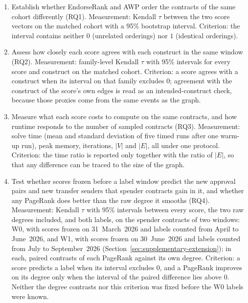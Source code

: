 \begin{enumerate}
\item[O1.] Establish whether EndorseRank and AWP order the contracts of the same cohort differently (RQ1). Measurement: Kendall $\tau$ between the two score vectors on the matched cohort with a 95\% bootstrap interval. Criterion: the interval contains neither $0$ (unrelated orderings) nor $1$ (identical orderings).
\item[O2.] Assess how closely each score agrees with each construct in the same window (RQ2). Measurement: family-level Kendall $\tau$ with 95\% intervals for every score and construct on the matched cohort. Criterion: a score agrees with a construct when its interval on that family excludes $0$; agreement with the construct of the score's own edges is read as an intended-construct check, because those proxies come from the same events as the graph.
\item[O3.] Measure what each score costs to compute on the same contracts, and how runtime responds to the number of sampled contracts (RQ3). Measurement: solve time (mean and standard deviation of five timed runs after one warm-up run), peak memory, iterations, $|V|$ and $|E|$, all under one protocol. Criterion: the time ratio is reported only together with the ratio of $|E|$, so that any difference can be traced to the size of the graph.
\item[O4.] Test whether scores frozen before a label window predict the new approval pairs and new transfer senders that spender contracts gain in it, and whether any PageRank does better than the raw degree it smooths (RQ4). Measurement: Kendall $\tau$ with 95\% intervals between every score, the two raw degrees included, and both labels, on the spender contracts of two windows: W0, with scores frozen on 31~March~2026 and labels counted from April to June~2026, and W1, with scores frozen on 30~June~2026 and labels counted from July to September~2026 (Section~\ref{sec:supplementary-extension}); in each, paired contrasts of each PageRank against its own degree. Criterion: a score predicts a label when its interval excludes $0$, and a PageRank improves on its degree only when the interval of the paired difference lies above $0$. Neither the degree contrasts nor this criterion was fixed before the W0 labels were known.

\end{enumerate}
